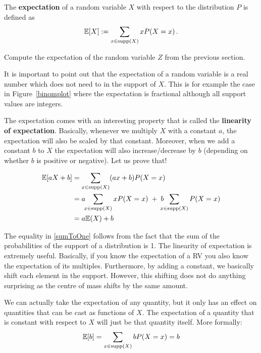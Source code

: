 \begin{Definition}[Expectation]
The \textbf{expectation} of a random variable $ X $ with respect to the distribution $ P $ is defined as
$$ \mathbb{E}[X] := \sum_{x \in \operatorname{supp}(X)} x P(X=x) \, . $$
\end{Definition}

\begin{Exercise}
Compute the expectation of the random variable $ Z $ from the previous section.
\end{Exercise}

It is important to point out that the expectation of a random variable is a real number  which does not need to in the support of $ X $. This is for example the case in Figure~\ref{binomplot} where the
expectation is fractional although all support values are integers.

The expectation comes with an interesting property that is called the \textbf{linearity of expectation}. Basically, whenever we multiply $ X $ with a constant $ a $, the expectation will also be scaled by that constant. Moreover, when we add a constant $ b $
to $ X $ the expectation will also increase/decrease by $ b $ (depending on whether $ b $ is positive or negative). Let us
prove that!

\begin{align}
\mathbb{E}[aX+b] &= \sum_{x \in \operatorname{supp}(X)} (ax+b) P(X=x) \\
&= a \!\! \sum_{x \in \operatorname{supp}(X)} x P(X=x) \; + \; b \!\!\!\! \sum_{x \in \operatorname{supp}(X)} P(X=x)\\
&= a \mathbb{E}(X) + b \label{sumToOne}
\end{align}

The equality in \eqref{sumToOne} follows from the fact that the sum of the probabilities of the support of a distribution is 1.
The linearity of expectation is extremely useful. Basically, if you know the expectation of a RV you also know the 
expectation of its multiples. Furthermore, by adding a constant, we basically shift each element in the support. However, this shifting
does not do anything surprising as the centre of mass shifts by the same amount.

We can actually take the expectation of any quantity, but it only has an effect on quantities that
can be cast as functions of $ X $. The expectation of a quantity that is constant with respect to $ X $ will just be that
quantity itself. More formally:
\begin{equation}
\mathbb{E}[b] = \sum_{x \in \operatorname{supp}(X)} b P(X=x) = b
\end{equation}

